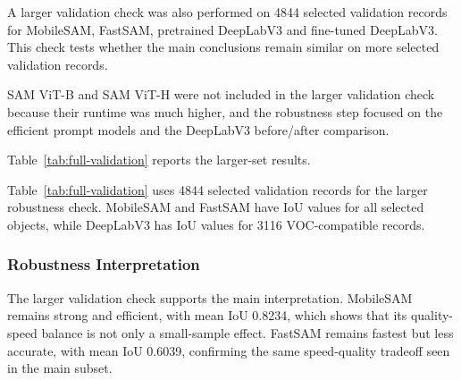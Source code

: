 \documentclass[9pt,a4paper,oneside]{rho-class/rho}
\begin{document}
    A larger validation check was also performed on 4844 selected validation records for MobileSAM, FastSAM, pretrained DeepLabV3 and fine-tuned DeepLabV3. This check tests whether the main conclusions remain similar on more selected validation records.

    SAM ViT-B and SAM ViT-H were not included in the larger validation check because their runtime was much higher, and the robustness step focused on the efficient prompt models and the DeepLabV3 before/after comparison.

    Table~\ref{tab:full-validation} reports the larger-set results.

\begin{table}[H]
    \centering
    \caption{Full-validation robustness check.}
    \label{tab:full-validation}
\end{table}

    Table~\ref{tab:full-validation} uses 4844 selected validation records for the larger robustness check. MobileSAM and FastSAM have IoU values for all selected objects, while DeepLabV3 has IoU values for 3116 VOC-compatible records.

\subsubsection{Robustness Interpretation}

    The larger validation check supports the main interpretation. MobileSAM remains strong and efficient, with mean IoU 0.8234, which shows that its quality-speed balance is not only a small-sample effect. FastSAM remains fastest but less accurate, with mean IoU 0.6039, confirming the same speed-quality tradeoff seen in the main subset.
\end{document}
